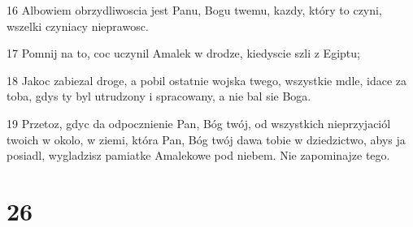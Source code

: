 \par 16 Albowiem obrzydliwoscia jest Panu, Bogu twemu, kazdy, który to czyni, wszelki czyniacy nieprawosc.
\par 17 Pomnij na to, coc uczynil Amalek w drodze, kiedyscie szli z Egiptu;
\par 18 Jakoc zabiezal droge, a pobil ostatnie wojska twego, wszystkie mdle, idace za toba, gdys ty byl utrudzony i spracowany, a nie bal sie Boga.
\par 19 Przetoz, gdyc da odpocznienie Pan, Bóg twój, od wszystkich nieprzyjaciól twoich w okolo, w ziemi, która Pan, Bóg twój dawa tobie w dziedzictwo, abys ja posiadl, wygladzisz pamiatke Amalekowe pod niebem. Nie zapominajze tego.

\chapter{26}

